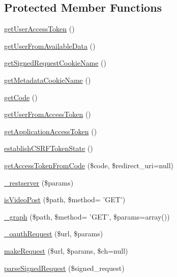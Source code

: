 \subsection*{Protected Member Functions}
\begin{DoxyCompactItemize}
\item 
\hyperlink{class_base_facebook_afe9aab209768e4d4cc4c959f4dff4310}{get\-User\-Access\-Token} ()
\item 
\hyperlink{class_base_facebook_ad3dbf5723aa966c9618d1d109526dc4b}{get\-User\-From\-Available\-Data} ()
\item 
\hyperlink{class_base_facebook_a67b1b4b1b2337a342ed03aa0a8f91ec5}{get\-Signed\-Request\-Cookie\-Name} ()
\item 
\hyperlink{class_base_facebook_ac73bdb41c831a2176eaea8902fdb7d71}{get\-Metadata\-Cookie\-Name} ()
\item 
\hyperlink{class_base_facebook_a63452f26d5a4fc7fbcb1732920c1758e}{get\-Code} ()
\item 
\hyperlink{class_base_facebook_ac67c523b16b29ab94354fd518b4daf06}{get\-User\-From\-Access\-Token} ()
\item 
\hyperlink{class_base_facebook_a18b991618948872f3f350ee088fea74d}{get\-Application\-Access\-Token} ()
\item 
\hyperlink{class_base_facebook_a461a0bb17c1aec841d401983e069f06a}{establish\-C\-S\-R\-F\-Token\-State} ()
\item 
\hyperlink{class_base_facebook_a5cf64ed0104ccf5267e9cee1e73ed783}{get\-Access\-Token\-From\-Code} (\$code, \$redirect\-\_\-uri=null)
\item 
\hyperlink{class_base_facebook_a3235e3e5d0c4129e919ab2be464fab4e}{\-\_\-restserver} (\$params)
\item 
\hyperlink{class_base_facebook_a59ec8025b618af99293ac5efc9d88a59}{is\-Video\-Post} (\$path, \$method= 'G\-E\-T')
\item 
\hyperlink{class_base_facebook_af0966973d145fbb9c2add330a46c7587}{\-\_\-graph} (\$path, \$method= 'G\-E\-T', \$params=array())
\item 
\hyperlink{class_base_facebook_a87925b6d625110ec3aab4bad3100d4d3}{\-\_\-oauth\-Request} (\$url, \$params)
\item 
\hyperlink{class_base_facebook_acded7c1ecb37c2745c734f4736b3c8ac}{make\-Request} (\$url, \$params, \$ch=null)
\item 
\hyperlink{class_base_facebook_a0f155bb002187e66febf73bef11aeb4d}{parse\-Signed\-Request} (\$signed\-\_\-request)
\item 

\end{DoxyCompactItemize}

